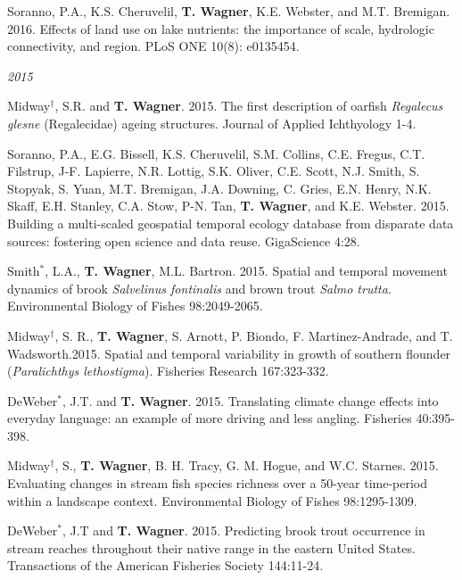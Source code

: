 \documentclass[10pt]{article}
\begin{document}
\begin{flushleft}
\begin{etaremune}[start=55]
\item Soranno, P.A., K.S. Cheruvelil, {\bf T. Wagner}, K.E. Webster, and M.T. Bremigan. 2016. Effects of land use on lake nutrients: the importance of scale, hydrologic connectivity, and region. PLoS ONE  10(8): e0135454.

\end{etaremune}
\emph{2015}
\begin{etaremune}[start=48]
\item Midway$^\dagger$, S.R. and {\bf T. Wagner}. 2015. The first description of oarfish \emph{Regalecus glesne} (Regalecidae) ageing structures. Journal of Applied Ichthyology 1-4.

\item Soranno, P.A., E.G. Bissell, K.S. Cheruvelil, S.M. Collins, C.E. Fregus, C.T. Filstrup, J-F. Lapierre, N.R. Lottig, S.K. Oliver, C.E. Scott, N.J. Smith, S. Stopyak, S. Yuan, M.T. Bremigan, J.A. Downing, C. Gries, E.N. Henry, N.K. Skaff, E.H. Stanley, C.A. Stow, P-N. Tan, {\bf T. Wagner}, and K.E. Webster. 2015. Building a multi-scaled geospatial temporal ecology database from disparate data sources: fostering open science and data reuse. GigaScience 4:28.

\item Smith$^*$, L.A., {\bf T. Wagner}, M.L. Bartron. 2015. Spatial and temporal movement dynamics of brook \emph{Salvelinus fontinalis} and brown trout \emph{Salmo trutta}. Environmental Biology of Fishes 98:2049-2065.

\item Midway$^\dagger$, S. R., {\bf T. Wagner}, S. Arnott, P. Biondo, F. Martinez-Andrade, and T. Wadsworth.2015. Spatial and temporal variability in growth of southern flounder (\emph{Paralichthys lethostigma}). Fisheries Research 167:323-332.

\item DeWeber$^*$, J.T. and {\bf T. Wagner}. 2015. Translating climate change effects into everyday language: an example of more driving and less angling. Fisheries 40:395-398.

\item Midway$^\dagger$, S., {\bf T. Wagner}, B. H. Tracy, G. M. Hogue, and W.C. Starnes. 2015. Evaluating changes in stream fish species richness over a 50-year time-period within a landscape context. Environmental Biology of Fishes 98:1295-1309.

\item DeWeber$^*$, J.T and {\bf T. Wagner}. 2015. Predicting brook trout occurrence in stream reaches throughout their native range in the eastern United States. Transactions of the American Fisheries Society 144:11-24. 


\end{etaremune}
\end{flushleft}
\end{document}
